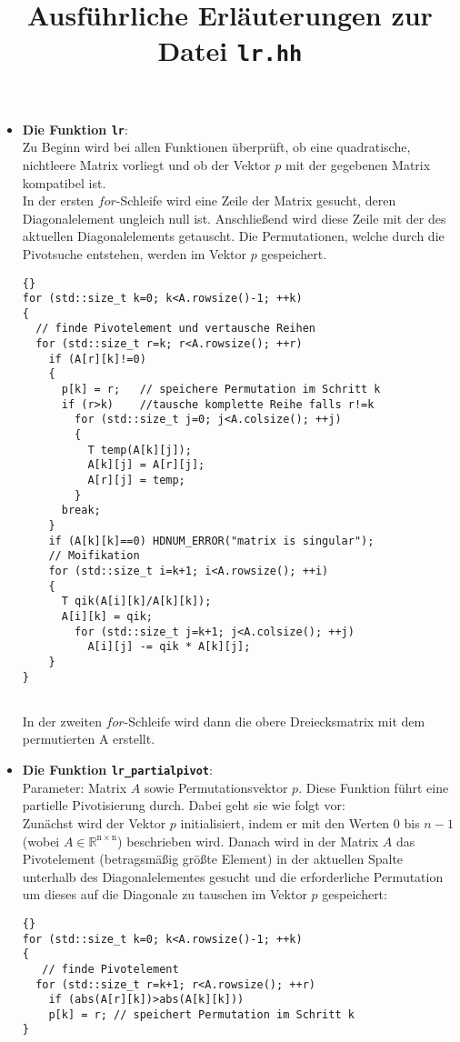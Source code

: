 \documentclass[a4paper,11pt]{article}
\theoremstyle{definition}
\begin{document}
\title{\textbf{Ausführliche Erläuterungen zur Datei \lstinline{lr.hh}}}
\begin{itemize}
\item \textbf{Die Funktion \lstinline{lr}}:\\
Zu Beginn wird bei allen Funktionen überprüft, ob eine quadratische, nichtleere Matrix vorliegt und ob der Vektor $p$ mit der gegebenen Matrix kompatibel ist. \\ 
In der ersten $for$-Schleife wird eine Zeile der Matrix gesucht, deren Diagonalelement ungleich null ist. Anschließend wird diese Zeile mit der des aktuellen Diagonalelements getauscht. Die Permutationen, welche durch die Pivotsuche entstehen, werden im Vektor $p$ gespeichert.\\

{\footnotesize{\begin{lstlisting}{}
for (std::size_t k=0; k<A.rowsize()-1; ++k)
{
  // finde Pivotelement und vertausche Reihen
  for (std::size_t r=k; r<A.rowsize(); ++r)
    if (A[r][k]!=0)
    {
      p[k] = r;   // speichere Permutation im Schritt k
      if (r>k)    //tausche komplette Reihe falls r!=k
        for (std::size_t j=0; j<A.colsize(); ++j)
        {
          T temp(A[k][j]);
          A[k][j] = A[r][j];
          A[r][j] = temp;
        }
      break;
    }
    if (A[k][k]==0) HDNUM_ERROR("matrix is singular");
    // Moifikation
    for (std::size_t i=k+1; i<A.rowsize(); ++i)
    {
      T qik(A[i][k]/A[k][k]);
      A[i][k] = qik;
        for (std::size_t j=k+1; j<A.colsize(); ++j)
          A[i][j] -= qik * A[k][j];
    }
}
  
\end{lstlisting}}}
In der zweiten $for$-Schleife wird dann die obere Dreiecksmatrix mit dem permutierten A erstellt.
\item \textbf{Die Funktion \lstinline{lr_partialpivot}}:\\
Parameter:  Matrix $A$ sowie Permutationsvektor $p$.
Diese Funktion führt eine partielle Pivotisierung durch. Dabei geht sie wie folgt vor:\\
Zunächst wird der Vektor $p$ initialisiert, indem er mit den Werten $0$ bis $n-1$ (wobei $A \in \mathbb{R^{\mathrm{n}\times \mathrm{n}}}$) beschrieben wird. Danach wird in der Matrix $A$ das Pivotelement (betragsmäßig größte Element) in der aktuellen Spalte unterhalb des Diagonalelementes gesucht und die erforderliche Permutation um dieses auf die Diagonale zu tauschen im Vektor $p$ gespeichert:
{\footnotesize{\begin{lstlisting}{}
for (std::size_t k=0; k<A.rowsize()-1; ++k)
{
   // finde Pivotelement
  for (std::size_t r=k+1; r<A.rowsize(); ++r)
    if (abs(A[r][k])>abs(A[k][k]))
    p[k] = r; // speichert Permutation im Schritt k
}
\end{lstlisting}}}


\end{itemize}
\end{document}
